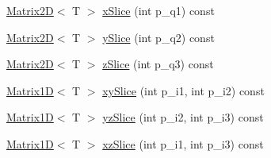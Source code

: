 \begin{DoxyCompactItemize}
\item 
\hyperlink{class_matrix2_d}{Matrix2\+D}$<$ T $>$ \hyperlink{class_matrix3_d_a927f87171f4dd79d37899824e88e254c}{x\+Slice} (int p\+\_\+q1) const 
\item 
\hyperlink{class_matrix2_d}{Matrix2\+D}$<$ T $>$ \hyperlink{class_matrix3_d_ab265bcbe033f0d7d9f659260ef09b2b3}{y\+Slice} (int p\+\_\+q2) const 
\item 
\hyperlink{class_matrix2_d}{Matrix2\+D}$<$ T $>$ \hyperlink{class_matrix3_d_a020184589ab3c48b85a03da7d279682d}{z\+Slice} (int p\+\_\+q3) const 
\item 
\hyperlink{class_matrix1_d}{Matrix1\+D}$<$ T $>$ \hyperlink{class_matrix3_d_a08c35d3a34ac5ac15a0dcf14339fa518}{xy\+Slice} (int p\+\_\+i1, int p\+\_\+i2) const 
\item 
\hyperlink{class_matrix1_d}{Matrix1\+D}$<$ T $>$ \hyperlink{class_matrix3_d_a061f9fd2fe6c18107c1d658e7141074c}{yz\+Slice} (int p\+\_\+i2, int p\+\_\+i3) const 
\item 
\hyperlink{class_matrix1_d}{Matrix1\+D}$<$ T $>$ \hyperlink{class_matrix3_d_ab77f0d84a967890d4e9e0b033e734a73}{xz\+Slice} (int p\+\_\+i1, int p\+\_\+i3) const 
\end{DoxyCompactItemize}
